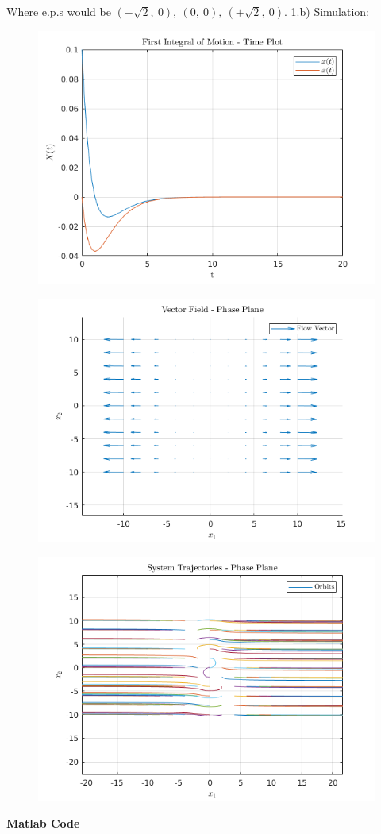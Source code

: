 \documentclass{homeworg}
\begin{document}
Where e.p.s would be \((-\sqrt{2},~0),~(0,~0),~(+\sqrt{2},~0)\).
\newpage
1.b) Simulation:
\begin{figure}[!htb]
  \includegraphics[width=.5\textwidth]{fig01.png}
  \centering
  \caption{}
\end{figure}
\begin{figure}[!htb]
  \includegraphics[width=.5\textwidth]{fig02.png}
  \centering
  \caption{}
\end{figure}
\begin{figure}[!htb]
  \includegraphics[width=.5\textwidth]{fig03.png}
  \centering
  \caption{}
\end{figure}

\clearpage
\noindent
\textbf{Matlab Code}


\end{document}
